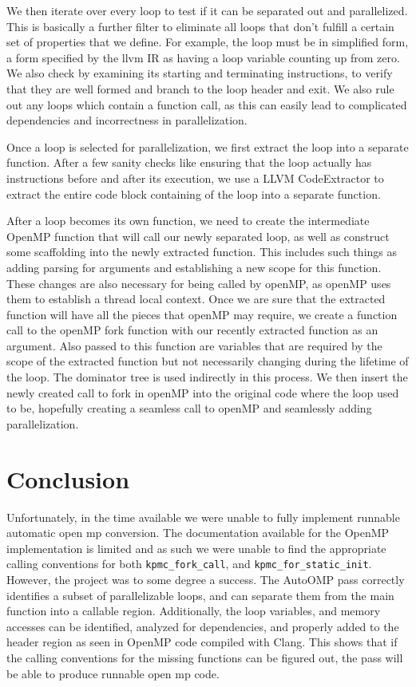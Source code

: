 \documentclass[conference]{IEEEtran}
\begin{document}
We then iterate over every loop to test if it can be separated out and
parallelized. This is basically a further filter to eliminate all
loops that don't fulfill a certain set of properties that we
define. For example, the loop must be in simplified form, a form specified
by the llvm IR as having a loop variable counting up from zero. We also
check by examining its starting and terminating instructions, to verify
that they are well formed and branch to the loop header and exit. We also
rule out any loops which contain a function call, as this can easily
lead to complicated dependencies and incorrectness in parallelization.

Once a loop is selected for parallelization, we first extract the loop
into a separate function. After a few sanity checks like ensuring that
the loop actually has instructions before and after its execution, we
use a LLVM CodeExtractor to extract the entire code block containing
of the loop into a separate function.

After a loop becomes its own function, we need to create the
intermediate OpenMP function that will call our newly separated loop,
as well as construct some scaffolding into the newly extracted
function. This includes such things as adding parsing for arguments
and establishing a new scope for this function. These changes are also
necessary for being called by openMP, as openMP uses them to establish
a thread local context. Once we are sure that the extracted function
will have all the pieces that openMP may require, we create a function
call to the openMP fork function with our recently extracted function
as an argument. Also passed to this function are variables that are
required by the scope of the extracted function but not necessarily
changing during the lifetime of the loop. The dominator tree is used
indirectly in this process. We then insert the newly created call to
fork in openMP into the original code where the loop used to be,
hopefully creating a seamless call to openMP and seamlessly adding
parallelization.




\section{Conclusion}

Unfortunately, in the time available we were unable to fully implement runnable automatic
open mp conversion. The documentation available for the OpenMP implementation is limited
and as such we were unable to find the appropriate calling conventions for both
\texttt{kpmc\_fork\_call}, and \texttt{kpmc\_for\_static\_init}. However, the project was to some degree a success.
The AutoOMP pass correctly identifies a subset of parallelizable loops, and can separate them
from the main function into a callable region. Additionally, the loop variables, and memory accesses
can be identified, analyzed for dependencies, and properly added to the header region as seen in
OpenMP code compiled with Clang. This shows that if the calling conventions for the missing
functions can be figured out, the pass will be able to produce runnable open mp code.
\end{document}
